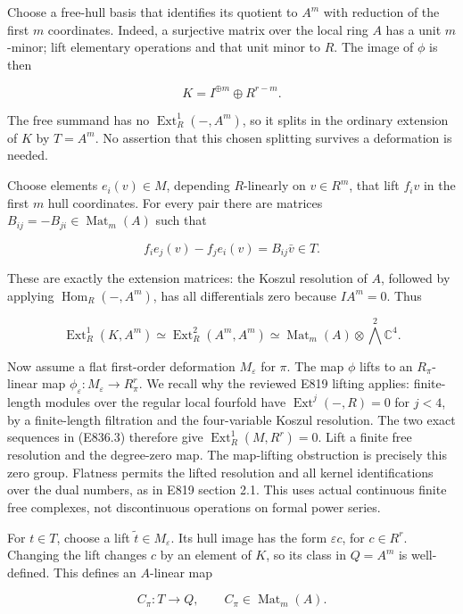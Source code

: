 Choose a free-hull basis that identifies its quotient to \(A^m\) with
reduction of the first \(m\) coordinates. Indeed, a surjective matrix
over the local ring \(A\) has a unit \(m\)-minor; lift elementary
operations and that unit minor to \(R\). The image of \(\phi\) is then

\[
 K=I^{\oplus m}\oplus R^{r-m}.
 \tag{E836.5}
\]

The free summand has no \(\operatorname{Ext}^1_R(-,A^m)\), so it splits
in the ordinary extension of \(K\) by \(T=A^m\). No assertion that this
chosen splitting survives a deformation is needed.

Choose elements \(e_i(v)\in M\), depending \(R\)-linearly on
\(v\in R^m\), that lift \(f_i v\) in the first \(m\) hull coordinates.
For every pair there are matrices
\(B_{ij}=-B_{ji}\in\operatorname{Mat}_m(A)\) such that

\[
 f_i e_j(v)-f_j e_i(v)=B_{ij}\bar v\in T.
 \tag{E836.6}
\]

These are exactly the extension matrices: the Koszul resolution of
\(A\), followed by applying \(\operatorname{Hom}_R(-,A^m)\), has all
differentials zero because \(I A^m=0\). Thus

\[
 \operatorname{Ext}^1_R(K,A^m)
   \simeq\operatorname{Ext}^2_R(A^m,A^m)
   \simeq\operatorname{Mat}_m(A)\otimes\bigwedge^2\mathbb C^4.
 \tag{E836.7}
\]

Now assume a flat first-order deformation \(M_\varepsilon\) for \(\pi\).
The map \(\phi\) lifts to an \(R_\pi\)-linear map
\(\phi_\varepsilon:M_\varepsilon\to R_\pi^r\). We recall why the
reviewed E819 lifting applies: finite-length modules over the regular
local fourfold have \(\operatorname{Ext}^j(-,R)=0\) for \(j<4\), by a
finite-length filtration and the four-variable Koszul resolution. The
two exact sequences in (E836.3) therefore give
\(\operatorname{Ext}^1_R(M,R^r)=0\). Lift a finite free resolution and
the degree-zero map. The map-lifting obstruction is precisely this zero
group. Flatness permits the lifted resolution and all kernel
identifications over the dual numbers, as in E819 section 2.1. This uses
actual continuous finite free complexes, not discontinuous operations on
formal power series.

For \(t\in T\), choose a lift \(\widetilde t\in M_\varepsilon\). Its
hull image has the form \(\varepsilon c\), for \(c\in R^r\). Changing
the lift changes \(c\) by an element of \(K\), so its class in \(Q=A^m\)
is well-defined. This defines an \(A\)-linear map

\[
 C_\pi:T\longrightarrow Q,
 \qquad C_\pi\in\operatorname{Mat}_m(A).
 \tag{E836.8}
\]

